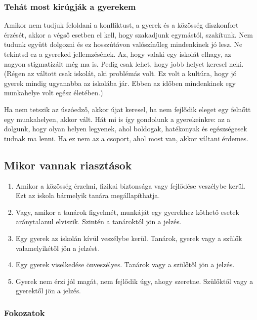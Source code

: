 \hypertarget{tehat-most-kirugjak-a-gyerekem}{%
\subsubsection{Tehát most kirúgják a
gyerekem}\label{tehat-most-kirugjak-a-gyerekem}}

Amikor nem tudjuk feloldani a konfliktust, a gyerek és a közösség
diszkonfort érzését, akkor a végső esetben el kell, hogy szakadjunk
egymástól, szakítunk. Nem tudunk együtt dolgozni és ez hosszútávon
valószínűleg mindenkinek jó lesz. Ne tekintsd ez a gyereked
jellemzésének. Az, hogy valaki egy iskolát elhagy, az nagyon
stigmatizált még ma is. Pedig csak lehet, hogy jobb helyet keresel neki.
(Régen az váltott csak iskolát, aki problémás volt. Ez volt a kultúra,
hogy jó gyerek mindig ugyanabba az iskolába jár. Ebben az időben
mindenkinek egy munkahelye volt egész életében.)

Ha nem tetszik az úszóedző, akkor újat keresel, ha nem fejlődik eleget
egy felnőtt egy munkahelyen, akkor vált. Hát mi is így gondolunk a
gyerekeinkre: az a dolgunk, hogy olyan helyen legyenek, ahol boldogak,
hatékonyak és egészségesek tudnak ma lenni. Ha ez nem az a csoport, ahol
most van, akkor váltani érdemes.

\hypertarget{mikor-vannak-riasztasok}{%
\subsection{Mikor vannak riasztások}\label{mikor-vannak-riasztasok}}

\begin{enumerate}
\def\labelenumi{\arabic{enumi}.}
\item
  Amikor a közösség érzelmi, fizikai biztonsága vagy fejlődése veszélybe
  kerül. Ezt az iskola bármelyik tanára megállapíthatja.
\item
  Vagy, amikor a tanárok figyelmét, munkáját egy gyerekhez köthető
  esetek aránytalanul elviszik. Szintén a tanároktól jön a jelzés.
\item
  Egy gyerek az iskolán kívül veszélybe kerül. Tanárok, gyerek vagy a
  szülők valamelyikétől jön a jelzést.
\item
  Egy gyerek viselkedése önveszélyes. Tanárok vagy a szülőtől jön a
  jelzés.
\item
  Gyerek nem érzi jól magát, nem fejlődik úgy, ahogy szeretne. Szülőktől
  vagy a gyerektől jön a jelzés.
\end{enumerate}

\hypertarget{fokozatok}{%
\subsubsection{Fokozatok}\label{fokozatok}}

